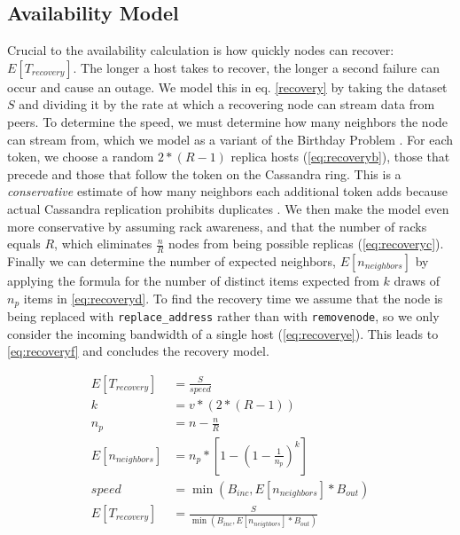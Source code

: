 \documentclass{article}
\begin{document}
\subsection{Availability Model}

Crucial to the availability calculation is how quickly nodes can recover:
$E[T_{recovery}]$. The longer a host takes to recover, the longer a second failure
can occur and cause an outage. We model this in eq. \ref{recovery} by taking
the dataset $S$ and dividing it by the rate at which a recovering node can
stream data from peers. To determine the speed, we must determine how many neighbors
the node can stream from, which we model as a variant of the Birthday Problem
\cite{neighbors}. For each token, we choose a random $2 * (R - 1)$ replica hosts
(\ref{eq:recoveryb}), those that precede and those that follow the token on the
Cassandra ring. This is a \textit{conservative} estimate of how many neighbors
each additional token adds because actual Cassandra replication prohibits
duplicates \cite{replication}. We then make the model even more conservative by
assuming rack awareness, and that the number of racks equals $R$, which
eliminates $\frac{n}{R}$ nodes from being possible replicas (\ref{eq:recoveryc}).
Finally we can determine the number of expected neighbors, $E[n_{neighbors}]$ by
applying the formula for the number of distinct items expected from $k$ draws of
$n_{p}$ items in \ref{eq:recoveryd}. To find the recovery time we assume that the
node is being replaced with \texttt{replace\_address} rather than with
\texttt{removenode}, so we only consider the incoming bandwidth of a single
host (\ref{eq:recoverye}). This leads to \ref{eq:recoveryf} and concludes the
recovery model.

\begin{subequations} \label{recovery}
    \begin{align}
        E[T_{recovery}] & = \frac{S}{speed} \\
        \label{eq:recoveryb}
        k & = v * (2 * (R - 1)) \\
        \label{eq:recoveryc}
        n_{p} & = n - \frac{n}{R} \\
        \label{eq:recoveryd}
        E[n_{neighbors}] & = n_{p} * [1 - (1-\frac{1}{n_{p}})^k] \\
        \label{eq:recoverye}
        speed & = \min(B_{inc}, E[n_{neighbors}] * B_{out}) \\
        \label{eq:recoveryf}
        E[T_{recovery}] & = \frac{S}{\min(B_{inc}, E[n_{neighbors}] * B_{out})}
    \end{align}
\end{subequations}
\end{document}
